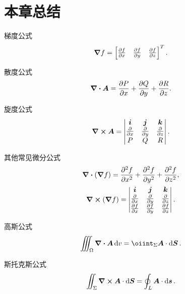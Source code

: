 \section{本章总结}
梯度公式\[
	\grad f
	= \begin{bmatrix}
		\pdv{f}{x} & \pdv{f}{y} & \pdv{f}{z}
	\end{bmatrix}^T.
\]

散度公式\[
	\div{\boldsymbol{A}}
	= \pdv{P}{x}+\pdv{Q}{y}+\pdv{R}{z}.
\]

旋度公式\[
	\curl{\boldsymbol{A}}
	= \begin{vmatrix}
		\boldsymbol{i} & \boldsymbol{j} & \boldsymbol{k} \\
		\pdv{x} & \pdv{y} & \pdv{z} \\
		P & Q & R
	\end{vmatrix}.
\]

其他常见微分公式\begin{gather*}
	\div(\grad f)
	= \pdv[2]{f}{x} + \pdv[2]{f}{y} + \pdv[2]{f}{z}, \\
	\curl(\grad f)
	= \begin{vmatrix}
		\boldsymbol{i} & \boldsymbol{j} & \boldsymbol{k} \\
		\pdv{x} & \pdv{y} & \pdv{z} \\
		\pdv{f}{x} & \pdv{f}{y} & \pdv{f}{z}
	\end{vmatrix}.
\end{gather*}

高斯公式\[
	\iiint_\Omega \div{\vb{A}} \dd{v}
	= \oiint_\Sigma \vb{A} \cdot \dd{\vb{S}}.
\]

斯托克斯公式\[
	\iint_\Sigma \curl{\boldsymbol{A}} \cdot \dd{\boldsymbol{S}}
	= \oint_L \boldsymbol{A} \cdot \dd{\boldsymbol{s}}.
\]
